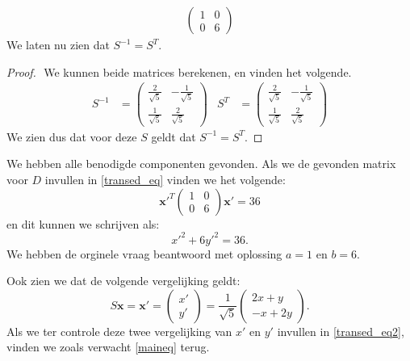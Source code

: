 \documentclass[12pt, dutch, a4paper]{article}
\theoremstyle{definition}
\begin{document}
\begin{enumerate}
\begin{align}
\begin{pmatrix}
            1 & 0 \\
            0 & 6
        \end{pmatrix} 
    \end{align}   
    We laten nu zien dat $S^{-1} = S^T$.
    \begin{proof} $ $ \newline
        We kunnen beide matrices berekenen, en vinden het volgende.
        \begin{align}
            S^{-1} &= 
            \begin{pmatrix}
                \frac{2}{\sqrt{5}} & -\frac{1}{\sqrt{5}} \\
                \frac{1}{\sqrt{5}} & \frac{2}{\sqrt{5}}
            \end{pmatrix} & 
            S^T &= 
            \begin{pmatrix}
                \frac{2}{\sqrt{5}} & -\frac{1}{\sqrt{5}} \\
                \frac{1}{\sqrt{5}} & \frac{2}{\sqrt{5}}
            \end{pmatrix} 
        \end{align}
        We zien dus dat voor deze $S$ geldt dat $S^{-1} = S^T$.

    \end{proof}
    
    We hebben alle benodigde componenten gevonden. Als we de gevonden matrix voor $D$ invullen in \cref{transed_eq} vinden we het volgende:
    \begin{equation}
        \mathbf{x'}^T 
        \begin{pmatrix}
            1 & 0 \\
            0 & 6
        \end{pmatrix} 
        \mathbf{x'} = 36
    \end{equation}
    en dit kunnen we schrijven als:
    \begin{equation} \label{transed_eq2}
        {x'}^2 + 6{y'}^2 = 36.
    \end{equation}
    We hebben de orginele vraag beantwoord met oplossing $a = 1$ en $b = 6$.

    Ook zien we dat de volgende vergelijking geldt: 
    \begin{equation}
        S\mathbf{x} = 
        \mathbf{x'} = 
        \begin{pmatrix}
            x' \\
            y'
        \end{pmatrix}
        = \frac{1}{\sqrt{5}}
        \begin{pmatrix}
            2x + y \\
            -x + 2y
        \end{pmatrix}.
    \end{equation}
    Als we ter controle deze twee vergelijking van $x'$ en $y'$ invullen in \cref{transed_eq2}, vinden we zoals verwacht \cref{maineq} terug.
\end{enumerate}
\end{document}
